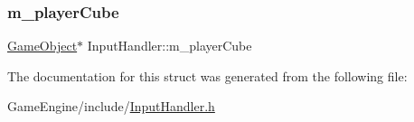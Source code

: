 \mbox{\label{struct_input_handler_a02162590271ed44ae87ce77e89023026}} 
\subsubsection{\texorpdfstring{m\+\_\+player\+Cube}{m\_playerCube}}
{\footnotesize\ttfamily \mbox{\hyperlink{class_game_object}{Game\+Object}}$\ast$ Input\+Handler\+::m\+\_\+player\+Cube}



The documentation for this struct was generated from the following file\+:\begin{DoxyCompactItemize}
\item 
Game\+Engine/include/\mbox{\hyperlink{_input_handler_8h}{Input\+Handler.\+h}}\end{DoxyCompactItemize}
